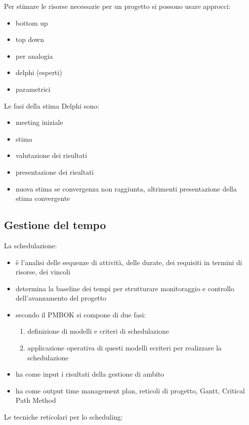 \documentclass[answers, a4paper, 11pt]{exam}
\begin{document}
Per stimare le risorse necessarie per un progetto si possono usare approcci:
\begin{itemize}
    \item bottom up
    \item top down
    \item per analogia
    \item delphi (esperti)
    \item parametrici
\end{itemize}

Le fasi della stima Delphi sono:

\begin{itemize}
    \item meeting iniziale
    \item stima
    \item valutazione dei risultati
    \item presentazione dei risultati
    \item nuova stima se convergenza non raggiunta, altrimenti presentazione della stima convergente
\end{itemize}

\subsection{Gestione del tempo}

La schedulazione:
\begin{itemize}
    \item è l'analisi delle sequenze di attività, delle durate, dei requisiti in termini di risorse, dei vincoli
    \item determina la baseline dei tempi per strutturare monitoraggio e controllo dell'avanzamento del progetto
    \item secondo il PMBOK si compone di due fasi:
    \begin{enumerate}
        \item definizione di modelli e criteri di schedulazione
        \item applicazione operativa di questi modelli ecriteri per realizzare la schedulazione
    \end{enumerate}
    \item ha come input i risultati della gestione di ambito
    \item ha come output time management plan, reticoli di progetto, Gantt, Critical Path Method
\end{itemize}

Le tecniche reticolari per lo scheduling:
\end{document}
